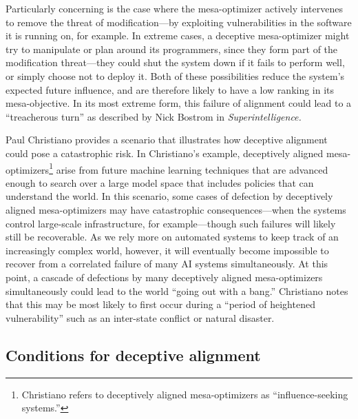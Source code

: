 \documentclass[
  onecolumn,
  natbib,
]{miri-tech-article}
\begin{document}
Particularly concerning is the case where the mesa-optimizer actively intervenes to remove the threat of modification---by exploiting vulnerabilities in the software it is running on, for example. In extreme cases, a deceptive mesa-optimizer might try to manipulate or plan around its programmers, since they form part of the modification threat---they could shut the system down if it fails to perform well, or simply choose not to deploy it. Both of these possibilities reduce the system's expected future influence, and are therefore likely to have a low ranking in its mesa-objective. In its most extreme form, this failure of alignment could lead to a ``treacherous turn'' as described by Nick Bostrom in \textit{Superintelligence.}\cite{superintelligence}

Paul Christiano provides a scenario that illustrates how deceptive alignment could pose a catastrophic risk.\cite{paul_doom} In Christiano's example, deceptively aligned mesa-optimizers\footnote{Christiano refers to deceptively aligned mesa-optimizers as ``influence-seeking systems.''} arise from future machine learning techniques that are advanced enough to search over a large model space that includes policies that can understand the world. In this scenario, some cases of defection by deceptively aligned mesa-optimizers may have catastrophic consequences---when the systems control large-scale infrastructure, for example---though such failures will likely still be recoverable. As we rely more on automated systems to keep track of an increasingly complex world, however, it will eventually become impossible to recover from a correlated failure of many AI systems simultaneously. At this point, a cascade of defections by many deceptively aligned mesa-optimizers simultaneously could lead to the world ``going out with a bang.''\cite{paul_doom} Christiano notes that this may be most likely to first occur during a ``period of heightened vulnerability'' such as an inter-state conflict or natural disaster.

\subsection{Conditions for deceptive alignment}
\label{sec:4.2}
\end{document}
